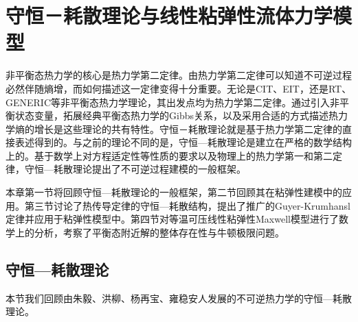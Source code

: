  \chapter{守恒－耗散理论与线性粘弹性流体力学模型}

 	非平衡态热力学的核心是热力学第二定律。由热力学第二定律可以知道不可逆过程必然伴随熵增，而如何描述这一定律变得十分重要。无论是CIT、EIT，还是RT、GENERIC等非平衡态热力学理论，其出发点均为热力学第二定律。通过引入非平衡状态变量，拓展经典平衡态热力学的Gibbs关系，以及采用合适的方式描述热力学熵的增长是这些理论的共有特性。守恒－耗散理论就是基于热力学第二定律的直接表述得到的。与之前的理论不同的是，守恒—耗散理论是建立在严格的数学结构上的。基于数学上对方程适定性等性质的要求以及物理上的热力学第一和第二定律，守恒—耗散理论提出了不可逆过程建模的一般框架\cite{zhu2014conservation,ottinger2005beyond,jou1996extended}。
	
	本章第一节将回顾守恒—耗散理论的一般框架，第二节回顾其在粘弹性建模中的应用。第三节讨论了热传导定律的守恒—耗散结构，提出了推广的Guyer-Krumhansl定律并应用于粘弹性模型中。第四节对等温可压线性粘弹性Maxwell模型进行了数学上的分析，考察了平衡态附近解的整体存在性与牛顿极限问题。

	\section{守恒—耗散理论}
	本节我们回顾由朱毅、洪柳、杨再宝、雍稳安人发展的不可逆热力学的守恒—耗散理论。

